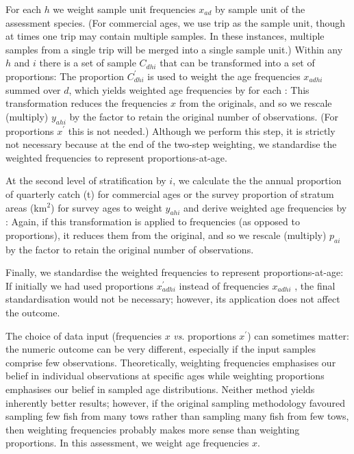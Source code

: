 For each  $h$ we weight sample unit frequencies $x_{ad}$ by sample unit  of the assessment species. (For commercial ages, we use trip as the sample unit, though at times one trip may contain multiple samples. In these instances, multiple samples from a single trip will be merged into a single sample unit.) Within any  $h$ and  $i$ there is a set of sample  $C_{dhi}$ that can be transformed into a set of proportions:
%
%
The proportion $C_{dhi}^\prime$ is used to weight the age frequencies $x_{adhi}$ summed over $d$, which yields weighted age frequencies by  for each :
%
%
This transformation reduces the frequencies $x$ from the originals, and so we rescale (multiply) $y_{ahi}$ by the factor
%
%
to retain the original number of observations. (For proportions $x^\prime$ this is not needed.) Although we perform this step, it is strictly not necessary because at the end of the two-step weighting, we standardise the weighted frequencies to represent proportions-at-age.

At the second level of stratification by  $i$, we calculate the the annual proportion of quarterly catch (t) for commercial ages or the survey proportion of stratum areas (km$^2$) for survey ages
%
%
to weight $y_{ahi}$ and derive weighted age frequencies by :
%
%
Again, if this transformation is applied to frequencies (as opposed to proportions), it reduces them from the original, and so we rescale (multiply) $p_{ai}$ by the factor
%
%
to retain the original number of observations.

Finally, we standardise the weighted frequencies to represent proportions-at-age:
%
%
If initially we had used proportions $x_{adhi}^\prime$ instead of frequencies $x_{adhi}$ , the final standardisation would not be necessary; however, its application does not affect the outcome.

The choice of data input (frequencies $x$ \emph{vs}. proportions $x^\prime$) can sometimes matter: the numeric outcome can be very different, especially if the input samples comprise few observations. Theoretically, weighting frequencies emphasises our belief in individual observations at specific ages while weighting proportions emphasises our belief in sampled age distributions. Neither method yields inherently better results; however, if the original sampling methodology favoured sampling few fish from many tows rather than sampling many fish from few tows, then weighting frequencies probably makes more sense than weighting proportions. In this assessment, we weight age frequencies $x$.

